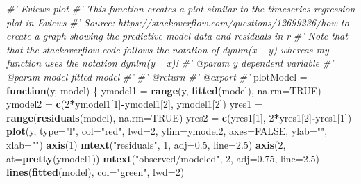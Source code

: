 \documentclass[]{book}
\newenvironment{Shaded}{\begin{snugshade}}{\end{snugshade}}
\newcommand{\CommentTok}[1]{\textcolor[rgb]{0.56,0.35,0.01}{\textit{#1}}}
\newcommand{\ControlFlowTok}[1]{\textcolor[rgb]{0.13,0.29,0.53}{\textbf{#1}}}
\newcommand{\DataTypeTok}[1]{\textcolor[rgb]{0.13,0.29,0.53}{#1}}
\newcommand{\DecValTok}[1]{\textcolor[rgb]{0.00,0.00,0.81}{#1}}
\newcommand{\FloatTok}[1]{\textcolor[rgb]{0.00,0.00,0.81}{#1}}
\newcommand{\KeywordTok}[1]{\textcolor[rgb]{0.13,0.29,0.53}{\textbf{#1}}}
\newcommand{\NormalTok}[1]{#1}
\newcommand{\OperatorTok}[1]{\textcolor[rgb]{0.81,0.36,0.00}{\textbf{#1}}}
\newcommand{\OtherTok}[1]{\textcolor[rgb]{0.56,0.35,0.01}{#1}}
\newcommand{\StringTok}[1]{\textcolor[rgb]{0.31,0.60,0.02}{#1}}
\begin{document}
\begin{Shaded}
\begin{Highlighting}[]
\CommentTok{#' Eviews plot}
\CommentTok{#' This function creates a plot similar to the timeseries regression plot in Eviews}
\CommentTok{#' Source: https://stackoverflow.com/questions/12699236/how-to-create-a-graph-showing-the-predictive-model-data-and-residuals-in-r}
\CommentTok{#' Note that that the stackoverflow code follows the notation of dynlm(x ~ y) whereas my function uses the notation dynlm(y ~ x)! }
\CommentTok{#' @param y dependent variable}
\CommentTok{#' @param model fitted model}
\CommentTok{#'}
\CommentTok{#' @return}
\CommentTok{#' @export}
\CommentTok{#'}
\NormalTok{plotModel =}\StringTok{  }\ControlFlowTok{function}\NormalTok{(y, model) \{}
\NormalTok{  ymodel1 =}\StringTok{ }\KeywordTok{range}\NormalTok{(y, }\KeywordTok{fitted}\NormalTok{(model), }\DataTypeTok{na.rm=}\OtherTok{TRUE}\NormalTok{)}
\NormalTok{  ymodel2 =}\StringTok{ }\KeywordTok{c}\NormalTok{(}\DecValTok{2}\OperatorTok{*}\NormalTok{ymodel1[}\DecValTok{1}\NormalTok{]}\OperatorTok{-}\NormalTok{ymodel1[}\DecValTok{2}\NormalTok{], ymodel1[}\DecValTok{2}\NormalTok{])}
\NormalTok{  yres1   =}\StringTok{ }\KeywordTok{range}\NormalTok{(}\KeywordTok{residuals}\NormalTok{(model), }\DataTypeTok{na.rm=}\OtherTok{TRUE}\NormalTok{)}
\NormalTok{  yres2   =}\StringTok{ }\KeywordTok{c}\NormalTok{(yres1[}\DecValTok{1}\NormalTok{], }\DecValTok{2}\OperatorTok{*}\NormalTok{yres1[}\DecValTok{2}\NormalTok{]}\OperatorTok{-}\NormalTok{yres1[}\DecValTok{1}\NormalTok{])}
  \KeywordTok{plot}\NormalTok{(y, }\DataTypeTok{type=}\StringTok{"l"}\NormalTok{, }\DataTypeTok{col=}\StringTok{"red"}\NormalTok{, }\DataTypeTok{lwd=}\DecValTok{2}\NormalTok{, }\DataTypeTok{ylim=}\NormalTok{ymodel2, }\DataTypeTok{axes=}\OtherTok{FALSE}\NormalTok{,}
       \DataTypeTok{ylab=}\StringTok{""}\NormalTok{, }\DataTypeTok{xlab=}\StringTok{""}\NormalTok{)}
  \KeywordTok{axis}\NormalTok{(}\DecValTok{1}\NormalTok{)}
  \KeywordTok{mtext}\NormalTok{(}\StringTok{"residuals"}\NormalTok{, }\DecValTok{1}\NormalTok{, }\DataTypeTok{adj=}\FloatTok{0.5}\NormalTok{, }\DataTypeTok{line=}\FloatTok{2.5}\NormalTok{)}
  \KeywordTok{axis}\NormalTok{(}\DecValTok{2}\NormalTok{, }\DataTypeTok{at=}\KeywordTok{pretty}\NormalTok{(ymodel1))}
  \KeywordTok{mtext}\NormalTok{(}\StringTok{"observed/modeled"}\NormalTok{, }\DecValTok{2}\NormalTok{, }\DataTypeTok{adj=}\FloatTok{0.75}\NormalTok{, }\DataTypeTok{line=}\FloatTok{2.5}\NormalTok{)}
  \KeywordTok{lines}\NormalTok{(}\KeywordTok{fitted}\NormalTok{(model), }\DataTypeTok{col=}\StringTok{"green"}\NormalTok{, }\DataTypeTok{lwd=}\DecValTok{2}\NormalTok{)}

\end{Highlighting}
\end{Shaded}
\end{document}
